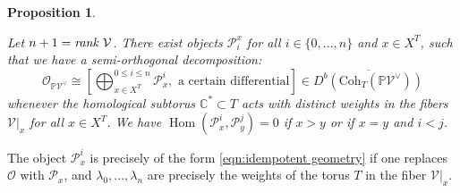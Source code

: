 \documentclass[12pt]{amsart}
\numberwithin{equation}{section}
\newtheorem{proposition}[theorem]{Proposition}
\theoremstyle{definition}
\theoremstyle{remark}
\DeclareMathOperator{\Hom}{Hom}
\newcommand{\CC}{\mathbb{C}}
\newcommand{\PP}{\mathbb{P}}
\newcommand{\CE}{\mathcal{E}}
\newcommand{\CO}{\mathcal{O}}
\newcommand{\CP}{\mathcal{P}}
\newcommand{\CQ}{\mathcal{Q}}
\newcommand{\CV}{\mathcal{V}}
\newcommand{\CW}{\mathcal{W}}
\renewcommand{\1}{\mathbf{1}}
\newcommand{\coh}{\mathrm{Coh}}
\begin{document}
\begin{proposition}
\label{prop:decomposition projective}

Let $n + 1 = \emph{rank }\CV$. There exist objects $\CP_i^x$ for all $i \in \{0,...,n\}$ and $x\in X^T$, such that we have a semi-orthogonal decomposition:
\begin{equation}
\label{eqn:decomposition}
\CO_{\PP \CV^{\vee}} \cong \left[ \bigoplus^{0\leq i \leq n}_{x\in X^T} \CP^i_x, \text{ a certain differential}\right] \in \overline{D^b(\coh_T(\PP \CV^\vee))}
\end{equation}
whenever the homological subtorus $\CC^* \subset T$ acts with distinct weights in the fibers $\CV|_x$ for all $x \in X^T$. We have $\Hom(\CP_x^i, \CP_y^j) = 0$ if $x>y$ or if $x=y$ and $i<j$.

\end{proposition}


The object $\CP_x^i$ is precisely of the form \eqref{eqn:idempotent geometry} if one replaces $\CO$ with $\CP_x$, and $\lambda_0,...,\lambda_n$ are precisely the weights of the torus $T$ in the fiber $\CV|_x$. 

\end{document}
